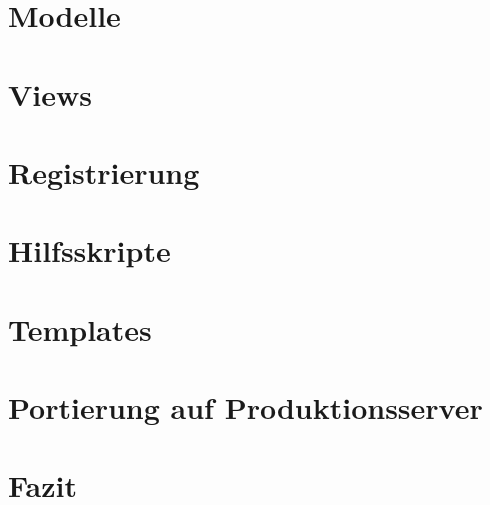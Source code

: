 \documentclass[titlepage, 12pt,a4paper]{scrartcl}
\begin{document}
\section{Modelle}
\section{Views}
\section{Registrierung}
\section{Hilfsskripte}
\section{Templates}
\section{Portierung auf Produktionsserver}
\section{Fazit}
\end{document}
